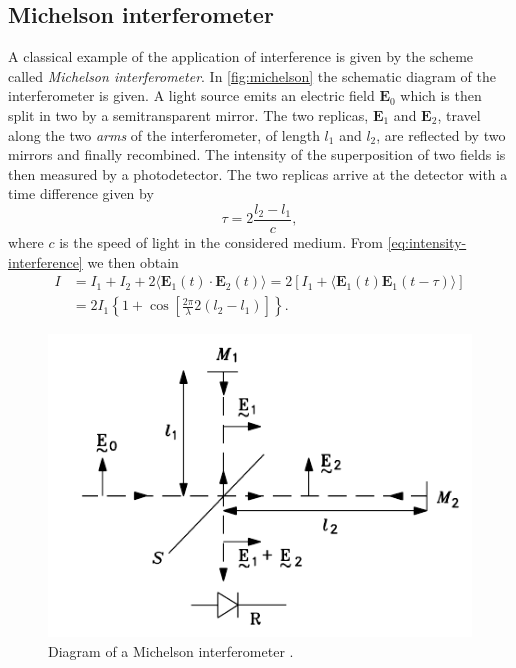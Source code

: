 \subsection{Michelson interferometer}
\label{sub:michelson}
A classical example of the application of interference is given by the scheme called \emph{Michelson interferometer}. In \autoref{fig:michelson} the schematic diagram of the interferometer is given. A light source emits an electric field $\textbf{E}_0$ which is then split in two by a semitransparent mirror. The two replicas, $\textbf{E}_1$ and $\textbf{E}_2$, travel along the two \emph{arms} of the interferometer, of length $l_1$ and $l_2$, are reflected by two mirrors and finally recombined. The intensity of the superposition of two fields is then measured by a photodetector. The two replicas arrive at the detector with a time difference given by
\begin{equation}
	\tau = 2\frac{l_2 - l_1}{c},
\end{equation}
where $c$ is the speed of light in the considered medium. From \autoref{eq:intensity-interference} we then obtain
\begin{align}\label{eq:michelson-intensity}
	I &= I_1 + I_2 + 2 \langle\textbf{E}_1(t) \cdot \textbf{E}_2(t)\rangle =  2 \left[I_1 + \langle\textbf{E}_1(t) \textbf{E}_1(t-\tau) \rangle\right]\\
	 &= 2I_1\left\{ 1 + \cos\left[\frac{2\pi}{\lambda}2(l_2-l_1)\right]\right\}.
\end{align}


\begin{figure}[hbt]
	\myfloatalign
	\includegraphics[width=0.7\linewidth]{gfx/michelson}
	\caption{Diagram of a Michelson interferometer \cite{Someda2006}. }\label{fig:michelson}
\end{figure}

